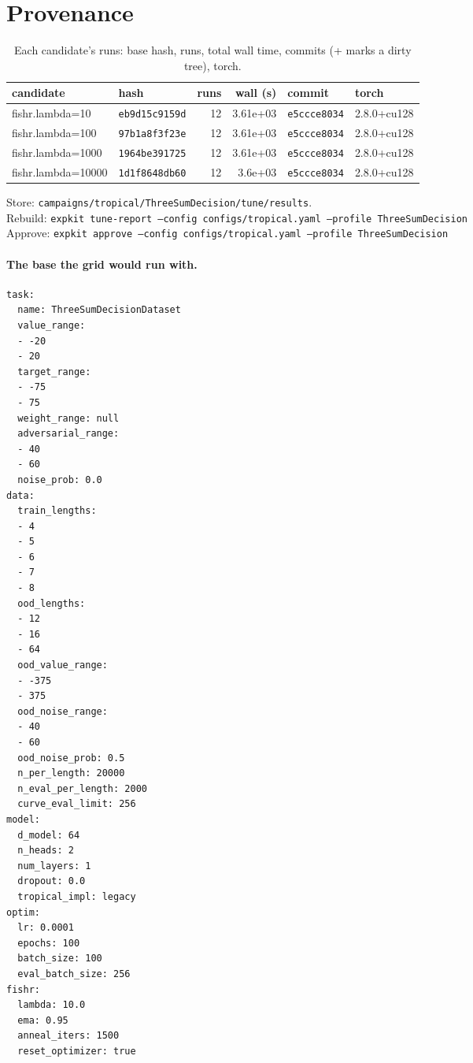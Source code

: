 \documentclass[10pt]{article}
\begin{document}
\section{Provenance}
{\small
\begin{longtable}{llrrll}
\caption{Each candidate's runs: base hash, runs, total wall time, commits (+ marks a dirty tree), torch.}\label{tab:provenance}\\
\toprule
candidate & hash & runs & wall (s) & commit & torch\\
\midrule
\endhead
fishr.lambda=10 & \texttt{eb9d15c9159d} & 12 & 3.61e+03 & \texttt{e5ccce8034} & 2.8.0+cu128\\
fishr.lambda=100 & \texttt{97b1a8f3f23e} & 12 & 3.61e+03 & \texttt{e5ccce8034} & 2.8.0+cu128\\
fishr.lambda=1000 & \texttt{1964be391725} & 12 & 3.61e+03 & \texttt{e5ccce8034} & 2.8.0+cu128\\
fishr.lambda=10000 & \texttt{1d1f8648db60} & 12 & 3.6e+03 & \texttt{e5ccce8034} & 2.8.0+cu128\\
\bottomrule
\end{longtable}
}
\noindent Store: \texttt{campaigns/tropical/ThreeSumDecision/tune/results}.\\
Rebuild: \texttt{expkit tune-report --config configs/tropical.yaml --profile ThreeSumDecision}\\
Approve: \texttt{expkit approve --config configs/tropical.yaml --profile ThreeSumDecision}

\paragraph{The base the grid would run with.}
{\footnotesize
\begin{verbatim}
task:
  name: ThreeSumDecisionDataset
  value_range:
  - -20
  - 20
  target_range:
  - -75
  - 75
  weight_range: null
  adversarial_range:
  - 40
  - 60
  noise_prob: 0.0
data:
  train_lengths:
  - 4
  - 5
  - 6
  - 7
  - 8
  ood_lengths:
  - 12
  - 16
  - 64
  ood_value_range:
  - -375
  - 375
  ood_noise_range:
  - 40
  - 60
  ood_noise_prob: 0.5
  n_per_length: 20000
  n_eval_per_length: 2000
  curve_eval_limit: 256
model:
  d_model: 64
  n_heads: 2
  num_layers: 1
  dropout: 0.0
  tropical_impl: legacy
optim:
  lr: 0.0001
  epochs: 100
  batch_size: 100
  eval_batch_size: 256
fishr:
  lambda: 10.0
  ema: 0.95
  anneal_iters: 1500
  reset_optimizer: true
\end{verbatim}
}

\clearpage
\appendix
\end{document}
